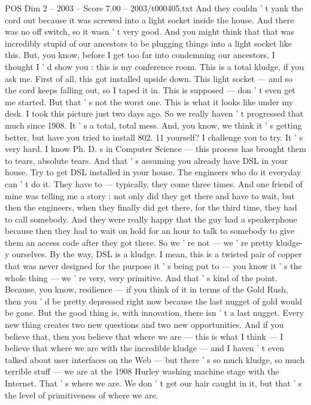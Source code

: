 \begin{textsample}{POS Dim 2 – 2003 – Score 7.00 – 2003/t000405.txt}
And they couldn ' t yank the cord out because it was screwed into a light socket inside the house.
And there was no off switch, so it wasn ' t very good.
And you might think that that was incredibly stupid of our ancestors to be plugging things into a light socket like this.
But, you know, before I get too far into condemning our ancestors, I thought I ' d show you : this is my conference room.
This is a total kludge, if you ask me.
First of all, this got installed upside down.
This light socket — and so the cord keeps falling out, so I taped it in.
This is supposed — don ' t even get me started.
But that ' s not the worst one.
This is what it looks like under my desk.
I took this picture just two days ago.
So we really haven ' t progressed that much since 1908.
It ' s a total, total mess.
And, you know, we think it ' s getting better, but have you tried to install 802. 11 yourself?
I challenge you to try.
It ' s very hard.
I know Ph.
D. s in Computer Science — this process has brought them to tears, absolute tears.
And that ' s assuming you already have DSL in your house.
Try to get DSL installed in your house.
The engineers who do it everyday can ' t do it.
They have to — typically, they come three times.
And one friend of mine was telling me a story : not only did they get there and have to wait, but then the engineers, when they finally did get there, for the third time, they had to call somebody.
And they were really happy that the guy had a speakerphone because then they had to wait on hold for an hour to talk to somebody to give them an access code after they got there.
So we ' re not — we ' re pretty kludge-y ourselves.
By the way, DSL is a kludge.
I mean, this is a twisted pair of copper that was never designed for the purpose it ' s being put to — you know it ' s the whole thing — we ' re very, very primitive.
And that ' s kind of the point.
Because, you know, resilience — if you think of it in terms of the Gold Rush, then you ' d be pretty depressed right now because the last nugget of gold would be gone.
But the good thing is, with innovation, there isn ' t a last nugget.
Every new thing creates two new questions and two new opportunities.
And if you believe that, then you believe that where we are — this is what I think — I believe that where we are with the incredible kludge — and I haven ' t even talked about user interfaces on the Web — but there ' s so much kludge, so much terrible stuff — we are at the 1908 Hurley washing machine stage with the Internet.
That ' s where we are.
We don ' t get our hair caught in it, but that ' s the level of primitiveness of where we are.

\end{textsample}
